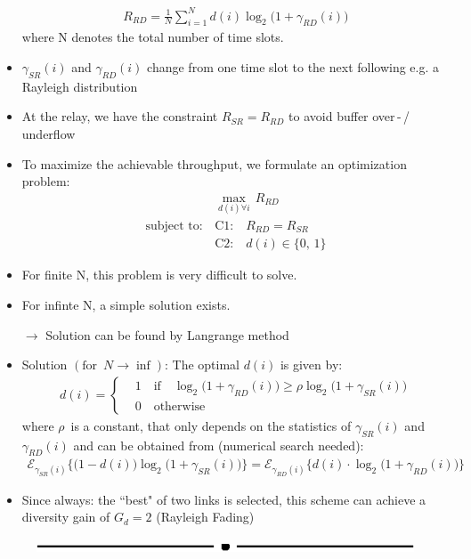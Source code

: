 \documentclass[a4paper, 10pt]{article}
\begin{document}
\begin{itemize}
	\begin{align*}
		R_{RD} = \frac{1}{N}\sum_{i=1}^{N}d(i)\log_2\bigl(1 + \gamma_{RD}(i)\bigr)
	\end{align*}
	where N denotes the total number of time slots.
	\item $\gamma_{SR}(i) $ and $ \gamma_{RD}(i) $ change from one time slot to the next following e.g. a Rayleigh distribution
	\item At the relay, we have the constraint $ R_{SR} = R_{RD} $ to avoid buffer over\,-\,/\,underflow
	\item To maximize the achievable throughput, we formulate an optimization problem:
	\begin{align*}
		&\underset{d(i) \forall i}{\max}\, R_{RD} \\ 
		\text{subject to:}\, &\text{C1:}\quad R_{RD} = R_{SR} \\
		&\text{C2:}\quad d(i) \in \{0,\,1\}
	\end{align*}
	\item For finite N, this problem is very difficult to solve.
	\item For infinte N, a simple solution exists.
	\item[$\rightarrow$] Solution can be found by Langrange method
	\item Solution $(\text{for }\, N \rightarrow \inf )$: The optimal $d(i) $ is given by:
	\begin{align*}
		d(i) = 
		\begin{cases}
			&1\quad \text{if}\quad \log_2\bigl( 1 + \gamma_{RD}(i)\bigr) \geq \rho \log_2\bigl( 1 + \gamma_{SR}(i)\bigr) \\
			&0\quad \text{otherwise} 
		\end{cases}
\end{align*}	 
	where $\rho $\, is a constant, that only depends on the statistics of $\gamma_{SR}(i) $ and $ \gamma_{RD}(i) $ and can be obtained from (numerical search needed):
	\begin{align*}
		\mathcal{E}_{\gamma_{SR}(i)}\bigl\{\bigl(1 - d(i)\bigr)\log_2\bigl(1 + \gamma_{SR}(i)\bigr)\bigr\} = \mathcal{E}_{\gamma_{RD}(i)}\bigl\{d(i)\cdot\log_2\bigl(1 + \gamma_{RD}(i)\bigr)\bigr\}
	\end{align*}
	\item Since always: the ``best" of two links is selected, this scheme can achieve a diversity gain of $G_d = 2 $ (Rayleigh Fading)
\end{itemize}
\vspace*{3cm}
\begin{figure}[ht]
	\centering
	\includegraphics[scale=1.4]{Ende}
\end{figure}
\end{document}
